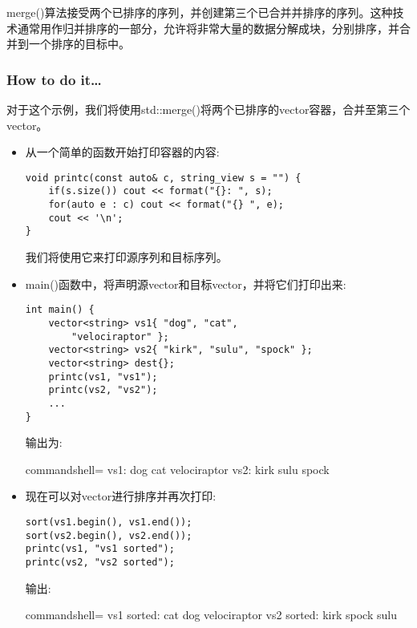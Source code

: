 
merge()算法接受两个已排序的序列，并创建第三个已合并并排序的序列。这种技术通常用作归并排序的一部分，允许将非常大量的数据分解成块，分别排序，并合并到一个排序的目标中。

\subsubsection{How to do it…}

对于这个示例，我们将使用std::merge()将两个已排序的vector容器，合并至第三个vector。

\begin{itemize}
\item 
从一个简单的函数开始打印容器的内容:

\begin{lstlisting}[style=styleCXX]
void printc(const auto& c, string_view s = "") {
	if(s.size()) cout << format("{}: ", s);
	for(auto e : c) cout << format("{} ", e);
	cout << '\n';
}
\end{lstlisting}

我们将使用它来打印源序列和目标序列。

\item 
main()函数中，将声明源vector和目标vector，并将它们打印出来:

\begin{lstlisting}[style=styleCXX]
int main() {
	vector<string> vs1{ "dog", "cat",
		"velociraptor" };
	vector<string> vs2{ "kirk", "sulu", "spock" };
	vector<string> dest{};
	printc(vs1, "vs1");
	printc(vs2, "vs2");
	...
}
\end{lstlisting}

输出为:

\begin{tcblisting}{commandshell={}}
vs1: dog cat velociraptor
vs2: kirk sulu spock
\end{tcblisting}

\item 
现在可以对vector进行排序并再次打印:

\begin{lstlisting}[style=styleCXX]
sort(vs1.begin(), vs1.end());
sort(vs2.begin(), vs2.end());
printc(vs1, "vs1 sorted");
printc(vs2, "vs2 sorted");
\end{lstlisting}

输出:

\begin{tcblisting}{commandshell={}}
vs1 sorted: cat dog velociraptor
vs2 sorted: kirk spock sulu
\end{tcblisting}


\end{itemize}
